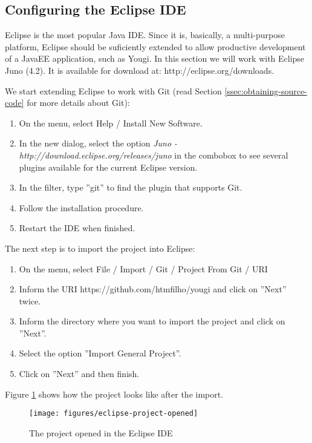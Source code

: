 \documentclass[envcountsame,envcountchap,letterpaper]{svmono}
\begin{document}
\subsection{Configuring the Eclipse IDE}

Eclipse is the most popular Java IDE. Since it is, basically, a multi-purpose platform, Eclipse should be suficiently extended to allow productive development of a JavaEE application, such as Yougi. In this section we will work with Eclipse Juno (4.2). It is available for download at: http://eclipse.org/downloads.

We start extending Eclipse to work with Git (read Section \ref{ssec:obtaining-source-code} for more details about Git):
\begin{enumerate}
\item On the menu, select Help / Install New Software.
\item In the new dialog, select the option \textit{Juno - http://download.eclipse.org/releases/juno} in the combobox to see several plugins available for the current Eclipse version.
\item In the filter, type ''git'' to find the plugin that supports Git.
\item Follow the installation procedure.
\item Restart the IDE when finished.
\end{enumerate}

The next step is to import the project into Eclipse:
\begin{enumerate}
\item On the menu, select File / Import / Git / Project From Git / URI
\item Inform the URI https://github.com/htmfilho/yougi and click on ''Next'' twice.
\item Inform the directory where you want to import the project and click on ''Next''.
\item Select the option ''Import General Project''.
\item Click on ''Next'' and then finish.
\end{enumerate}

Figure \ref{fig:eclipse-project-opened} shows how the project looks like after the import. 

\begin{figure}
\centering
\texttt{[image: figures/eclipse-project-opened]}
\caption{The project opened in the Eclipse IDE}
\label{fig:eclipse-project-opened}
\end{figure}
\end{document}
